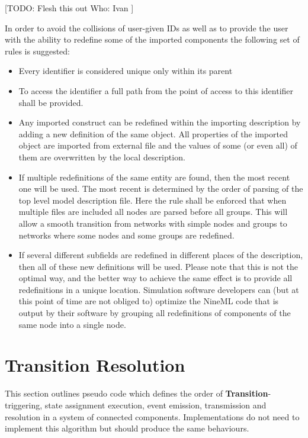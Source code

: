 \documentclass{article}
\newcommand{\Transition}{{\bf{Transition}}\xspace}
\begin{document}
[TODO:
Flesh this out
Who: Ivan
]

In order to avoid the collisions of user-given IDs as well as to
provide the user with the ability to redefine some of the imported
components the following set of rules is suggested:
\begin{itemize}
\item{Every identifier is considered unique only within its parent}
\item{To access the identifier a full path from the point of access
to this identifier shall be provided.}
\item{Any imported construct can be redefined within the importing
description by adding a new definition of the same object. All properties
of the imported object are imported from external file and the values of
some (or even all) of them are overwritten by the local description.}
\item{If multiple redefinitions of the same entity are found, then the most
recent one will be used. The most recent is determined by the order of
parsing of the top level model description file. Here the rule shall be
enforced that when multiple files are included all nodes are parsed before
all groups. This will allow a smooth transition from networks with simple
nodes and groups to networks where some nodes and some groups are redefined.}
\item{If several different subfields are redefined in different places of the
description, then all of these new definitions will be used. Please note that
this is not the optimal way, and the better way to achieve the same effect is
to provide all redefinitions in a unique location. Simulation software
developers can (but at this point of time are not obliged to) optimize the
NineML code that is output by their software by grouping all redefinitions
of components of the same node into a single node.}
\end{itemize}

\section{Transition Resolution}
\label{resolution}

This section outlines pseudo code which defines the order of
\Transition-triggering, state assignment execution, event emission,
transmission and resolution in a system of connected components.
Implementations do not need to implement this algorithm but should produce
the same behaviours.
\end{document}
